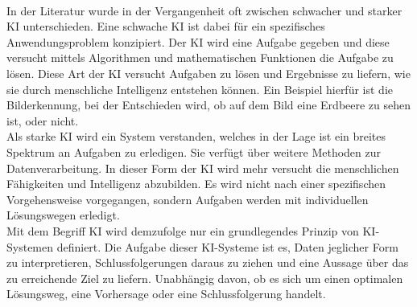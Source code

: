 \begin{onehalfspace}
        \\
        In der Literatur wurde in der Vergangenheit oft zwischen \glqq{}schwacher\grqq{} und \glqq{}starker\grqq{} \ac{KI} unterschieden. Eine schwache \ac{KI} ist dabei für ein spezifisches Anwendungsproblem konzipiert. Der \ac{KI} wird eine Aufgabe gegeben und diese versucht mittels Algorithmen und mathematischen Funktionen die Aufgabe zu lösen. Diese Art der \ac{KI} versucht Aufgaben zu lösen und Ergebnisse zu liefern, wie sie durch menschliche Intelligenz entstehen können.\cite{Lis2019} Ein Beispiel hierfür ist die Bilderkennung, bei der Entschieden wird, ob auf dem Bild eine Erdbeere zu sehen ist, oder nicht.
        \\
        Als starke \ac{KI} wird ein System verstanden, welches in der Lage ist ein breites Spektrum an Aufgaben zu erledigen.\cite{Datenkommission2019} Sie verfügt über weitere Methoden zur Datenverarbeitung. In dieser Form der \ac{KI} wird mehr versucht die menschlichen Fähigkeiten und Intelligenz abzubilden. Es wird nicht nach einer spezifischen Vorgehensweise vorgegangen, sondern Aufgaben werden mit individuellen Lösungswegen erledigt.\cite{Lis2019}
        \\
        Mit dem Begriff \ac{KI} wird demzufolge nur ein grundlegendes Prinzip von \ac*{KI}-Systemen definiert. Die Aufgabe dieser \ac*{KI}-Systeme ist es, Daten jeglicher Form zu interpretieren, Schlussfolgerungen daraus zu ziehen und eine Aussage über das zu erreichende Ziel zu liefern. Unabhängig davon, ob es sich um einen optimalen Lösungsweg, eine Vorhersage oder eine Schlussfolgerung handelt.\cite{HEGKI2019Definition}    
    

\end{onehalfspace}
